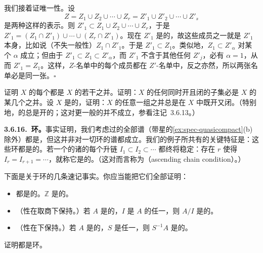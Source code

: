 我们接着证唯一性。设
\[
Z=Z_1\cup Z_2\cup\cdots\cup Z_r=Z'_1\cup Z'_2\cup\cdots\cup Z'_s
\]
是两种这样的表示。则 $Z'_1\subset Z_1\cup Z_2\cup\cdots\cup Z_r$，于是 $Z'_1=(Z_1\cap Z'_1)\cup\cdots\cup(Z_r\cap Z'_1)$。现在 $Z'_1$ 是\trIrreducible{}的，故这些成员之一就是 $Z'_1$ 本身，比如说（不失一般性）$Z_1\cap Z'_1$。于是 $Z'_1\subset Z_1$。类似地，$Z_1\subset Z'_\alpha$ 对某个 $\alpha$ 成立；但由于 $Z'_1\subset Z_1\subset Z'_\alpha$，而 $Z'_1$ 不含于其他任何 $Z'_j$，必有 $\alpha=1$，从而 $Z'_1=Z_1$。这样，$Z$-名单中的每个成员都在 $Z'$-名单中，反之亦然，所以两张名单必是同一张。\hfill$\square$

\begin{exercise}\label{ex:connected-components-union-irreducible}
证明\trTopologicalSpace{} $X$ 的每个\trConnectedComponent{}都是 $X$ 的若干\trIrreducibleComponent{}之并。证明：$X$ 的任何同时开且闭的子集必是 $X$ 的某几个\trConnectedComponent{}之并。设 $X$ 是\emph{\trNoetherian}的\trTopologicalSpace，证明：$X$ 的任意一组\trConnectedComponent{}之并总是在 $X$ 中既开又闭。（特别地，\trNoetherian{}\trTopologicalSpace{}的\trConnectedComponent{}总是开的；这对更一般的\trTopologicalSpace{}并不成立，参看注记~3.6.13。）
\end{exercise}

\textbf{3.6.16.\ \trNoether{}环。}\quad 事实证明，我们考虑过的全部谱（带星的\cref{ex:spec-quasicompact}(b) 除外）都是\trNoetherian{}\trTopologicalSpace，但这并非对一切环的谱都成立。我们的例子所共有的关键特征是：这些环都是\emph{\trNoetherian}的。若一个\trRing{}的诸\trIdeal{}的每个升链 $I_1\subset I_2\subset\cdots$ 都终将稳定：存在 $r$ 使得 $I_r=I_{r+1}=\cdots$，就称它是\textbf{\trNoetherian}的。（这对\trIdeal{}而言称为\textbf{\trAscendingChainCondition{}}（ascending chain condition）。）

下面是关于\trNoetherian{}环的几条速记事实。你应当能把它们全部证明：
\begin{itemize}
\item \trField{}都是\trNoetherian{}的。$\mathbb{Z}$ 是\trNoetherian{}的。
\item （\trNoetherian{}性在取商下保持。）若 $A$ 是\trNoetherian{}的，$I$ 是 $A$ 的任一\trIdeal，则 $A/I$ 是\trNoetherian{}的。
\item （\trNoetherian{}性在\trLocalization{}下保持。）若 $A$ 是\trNoetherian{}的，$S$ 是任一\trMultiplicativeSubset，则 $S^{-1}A$ 是\trNoetherian{}的。
\end{itemize}

\begin{exercise}\label{ex:pid-noetherian}
证明\trPID{}都是\trNoetherian{}环。
\end{exercise}

